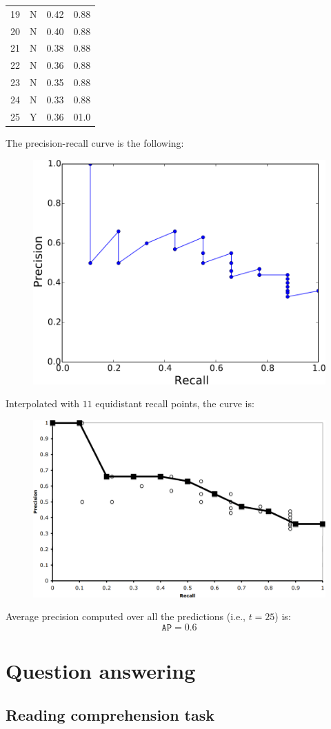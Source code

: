 \begin{example}
\begin{table}[H]
\begin{tabular}[t]{cccc}
            19 & N & 0.42 & 0.88 \\
            20 & N & 0.40 & 0.88 \\
            21 & N & 0.38 & 0.88 \\
            22 & N & 0.36 & 0.88 \\
            23 & N & 0.35 & 0.88 \\
            24 & N & 0.33 & 0.88 \\
            25 & Y & 0.36 & 01.0 \\
            \bottomrule
        \end{tabular}
    \end{table}

    The precision-recall curve is the following:
    \begin{figure}[H]
        \centering
        \includegraphics[width=0.4\linewidth]{./img/ir_pr_curve.png}
    \end{figure}
    Interpolated with $11$ equidistant recall points, the curve is:
    \begin{figure}[H]
        \centering
        \includegraphics[width=0.45\linewidth]{./img/ir_pr_interpolated.png}
    \end{figure}

    Average precision computed over all the predictions (i.e., $t=25$) is:
    \[ \texttt{AP} = 0.6 \]
\end{example}



\section{Question answering}


\subsection{Reading comprehension task}

